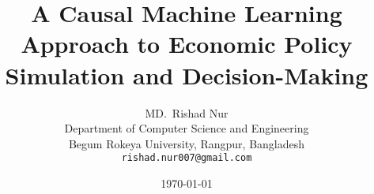 \documentclass[12pt,a4paper]{article}
\begin{document}
\title{A Causal Machine Learning Approach to Economic Policy Simulation and Decision-Making}

\author{MD.\ Rishad Nur \\
Department of Computer Science and Engineering \\
Begum Rokeya University, Rangpur, Bangladesh \\
\texttt{rishad.nur007@gmail.com}}

\date{\today}
\maketitle












\end{document}
